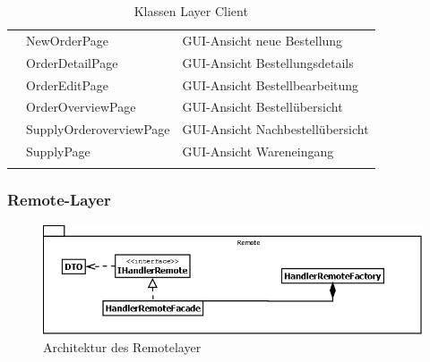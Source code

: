 \begin{longtable} {|l|ll|}
		& NewOrderPage                                                              & GUI-Ansicht neue Bestellung                                                                                                                     \\ \cline{2-3} 
		& OrderDetailPage                                                           & GUI-Ansicht Bestellungsdetails                                                                                                                  \\ \cline{2-3} 
		& OrderEditPage                                                             & GUI-Ansicht Bestellbearbeitung                                                                                                                  \\ \cline{2-3} 
		& OrderOverviewPage                                                         & GUI-Ansicht Bestellübersicht                                                                                                                    \\ \cline{2-3} 
		& SupplyOrderoverviewPage                                                   & GUI-Ansicht Nachbestellübersicht                                                                                                                \\ \cline{2-3} 
		& SupplyPage                                                                & GUI-Ansicht Wareneingang                                                                                                                        \\ \hline
	\caption{Klassen Layer Client}
	\label{tab:classes-layer-client}
\end{longtable}

\subsubsection{Remote-Layer}
\begin{figure}[H]
	\includegraphics[width=1.0\linewidth]{Images/RemoteLayer-Architektur}
	\caption{Architektur des Remotelayer}
	\label{fig:remotelayer-architektur}
\end{figure}

